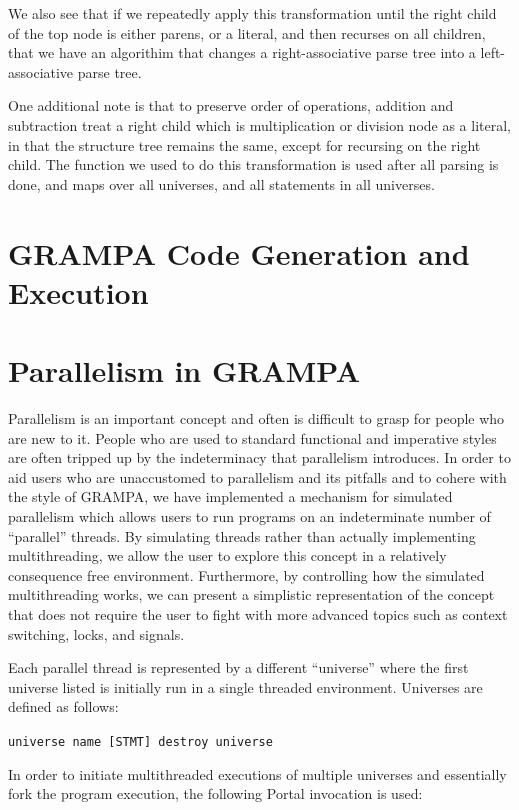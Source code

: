 \documentclass[numbers]{sigplanconf}
\begin{document}
We also see that if we repeatedly apply this transformation until the right child of the top node is either parens, 
or a literal, and then recurses on all children, that we have an algorithim that changes a right-associative parse tree
into a left-associative parse tree. 

One additional note is that to preserve order of operations, addition and subtraction treat a right child 
which is multiplication or division node as a literal, in that the structure tree remains the same, 
except for recursing on the right child. The function we used to do this transformation is used after all parsing 
is done, and maps over all universes, and all statements in all universes.


\section{GRAMPA Code Generation and Execution}

\section{Parallelism in GRAMPA}
Parallelism is an important concept and often is difficult to grasp for people who are new to it. People who are used to standard functional and imperative styles are often tripped up by the indeterminacy that parallelism introduces. In order to aid users who are unaccustomed to parallelism and its pitfalls and to cohere with the style of GRAMPA, we have implemented a mechanism for simulated parallelism which allows users to run programs on an indeterminate number of “parallel” threads. By simulating threads rather than actually implementing multithreading, we allow the user to explore this concept in a relatively consequence free environment. Furthermore, by controlling how the simulated multithreading works, we can present a simplistic representation of the concept that does not require the user to fight with more advanced topics such as context switching, locks, and signals.
	
Each parallel thread is represented by a different “universe” where the first universe listed is initially run in a single threaded environment. Universes are defined as follows:


\texttt{universe name [STMT] destroy universe}

	
In order to initiate multithreaded executions of multiple universes and essentially fork the program execution, the following Portal invocation is used:
	
\end{document}
